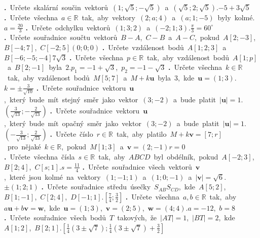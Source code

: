 \documentclass[12pt,a4paper]{extarticle}
\def\priklad#1#2{\advance\pr1\nointerlineskip\vbox to.066\vsize{\vss\hbox{{\Large\bfseries \tym\ifnum\pr<10 0\fi\the\pr}\quad#1}\vss}\vfil}
\def\printtym#1{\pr0\def\tym{#1}\priklady\vfill\newpage}
\def\priklad#1#2{\advance\pr1 \hbox{\textbf{\the\pr.} #1}\hbox{#2}\bigskip}
\def\R{\mathbb R}
\let\mb\mathbf
\begin{document}
\def\priklady{%
\priklad{Určete skalární součin vektorů $(1;\sqrt5;-\sqrt5)$ a $(\sqrt5; 2; \sqrt5)$.}{$-5+3\sqrt5$}
\priklad{Určete všechna $a \in \R$ tak, aby vektory $(2; a; 4)$ a $(a; 1; -5)$ byly kolmé.}{$a=\frac{20}3$}
\priklad{Určete odchylku vektorů $(1; 3; 2)$ a $(-2; 1; 3)$.}{$\frac\pi3 = 60^\circ$}
\priklad{Určete souřadnice součtu vektorů $B-A$, $C-B$ a $A-C$, pokud $A[2; -3]$, $B[-4; 7]$, $C[-2; 5]$}{$(0;0;0)$}
\priklad{Určete vzdálenost bodů $A[1;2;3]$ a $B[-6;-5;-4]$}{$7\sqrt3$}
\priklad{Určete všechna $p \in \R$ tak, aby vzdálenost bodů $A[1; p]$ a $B[2;-1]$ byla $2$.}{$p_1 = -1+\sqrt3$, $p_2 = -1-\sqrt3$}
\priklad{Určete všechna $k \in \R$ tak, aby vzdálenost bodů $M[5; 7]$ a $M + k\mb u$ byla $3$, kde $\mb u = (1; 3)$.}{$k = \pm \frac{3}{\sqrt{10}}$}
\priklad{Určete souřadnice vektoru $\mb u$, který bude mít stejný směr jako vektor $(3; -2)$ a bude platit $|\mb u| = 1$.}{$(\frac{3}{\sqrt{13}};-\frac2{\sqrt{13}})$}
\priklad{Určete souřadnice vektoru $\mb u$, který bude mít opačný směr jako vektor $(3; -2)$ a bude platit $|\mb u| = 1$.}{$(-\frac{3}{\sqrt{13}};\frac2{\sqrt{13}})$}
\priklad{Určete číslo $r \in \R$ tak, aby platilo $M + k\mb v = [7; r]$ pro nějaké $k \in \R$, pokud $M[1; 3]$ a $\mb v=(2; -1)$}{$r=0$}
\priklad{Určete všechna čísla $s \in \R$ tak, aby $ABCD$ byl obdélník, pokud $A[-2; 3]$, $B[2; 4]$, $C[s; 1]$.}{$s=\frac{11}4$}
\priklad{Určete souřadnice všech vektorů $\mb v$, které jsou kolmé na vektory $(1;-1;1)$ a $(1;0;-1)$ a $|\mb v| = \sqrt6$.}{$\pm(1; 2; 1)$}
\priklad{Určete souřadnice středu úsečky $S_{AB}S_{CD}$, kde $A[5;2]$, $B[1; -1]$, $C[2; 4]$, $D[-1; 1]$.}{$[\frac74;\frac32]$}
\priklad{Určete všechna $a, b\in \R$ tak, aby $a\mb u + b \mb v = \mb w$, kde $\mb u=(1; 3)$, $\mb v=(2; 5)$, $\mb w=(4; 4)$.}{$a = -12$, $b = 8$}
\priklad{Určete souřadnice všech bodů $T$ takových, že $|AT| = 1$, $|BT| = 2$, kde $A[1;2]$, $B[2;1]$.}{$[\frac{1}{4} \left(3\pm\sqrt{7}\right); \frac{1}{4} \left(3\pm\sqrt{7}\right)+\frac{3}{2}]$}
}

\printtym{A}
\end{document}
